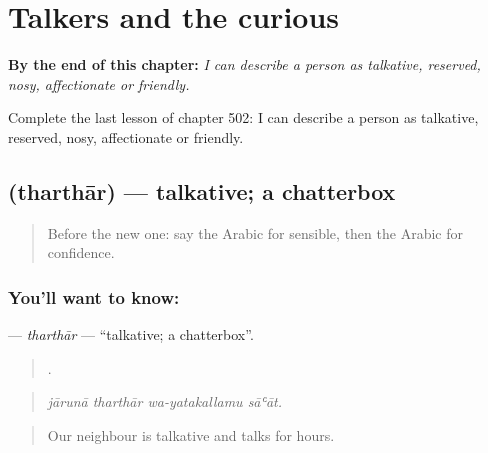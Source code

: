 
\chapter{Talkers and the curious}
\label{ch:ar-talkers-and-the-curious}

\begin{chapteropening}
\textbf{By the end of this chapter:} \emph{I can describe a person as talkative, reserved, nosy, affectionate or friendly.}

Complete the last lesson of chapter 502: I can describe a person as talkative, reserved, nosy, affectionate or friendly.
\end{chapteropening}

\section[\texorpdfstring{\ar{ثرثار} (tharthār)}{ثرثار (tharthār)}]{ (tharthār) — talkative; a chatterbox}

\label{lesson:AR-C502-tharthar}



\begin{quote}
Before the new one: say the Arabic for sensible, then the Arabic for confidence.
\end{quote}

\subsection*{You'll want to know: }
\textbf{} — \emph{tharthār} — \textquotedblleft{}talkative; a chatterbox\textquotedblright{}.

\begin{quote}
   .
\end{quote}

\begin{quote}
\emph{jārunā tharthār wa-yatakallamu sāʿāt.}
\end{quote}

\begin{quote}
Our neighbour is talkative and talks for hours.
\end{quote}

